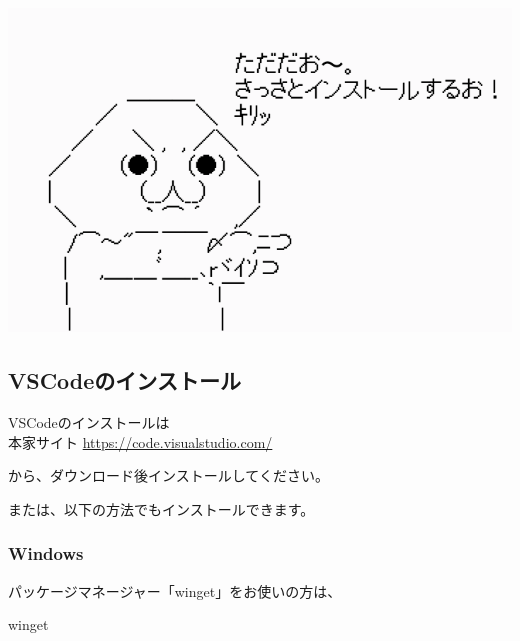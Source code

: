 \begin{reviewimage}[H]%
\includegraphics[width=0.5\maxwidth]{./images/01-createDevEnv/freeSoftware.png}%
\label{image:01-createDevEnv:freeSoftware}
\end{reviewimage}

\subsection{VSCodeのインストール}
\keeplastskip{
  \label{sec:1-2-1}
  \par\nobreak
}

VSCodeのインストールは\\[0pt]
本家サイト
\url{https://code.visualstudio.com/}

\vspace*{\baselineskip}

から、ダウンロード後インストールしてください。

\vspace*{\baselineskip}

または、以下の方法でもインストールできます。

\subsubsection*{Windows}
\keeplastskip{
  \label{sec:1-2-1-1}
  \par\nobreak
}

パッケージマネージャー「winget」をお使いの方は、

\def\startercodeblockfontsize{}
\begin{starterterminal}[]{winget}\end{starterterminal}

